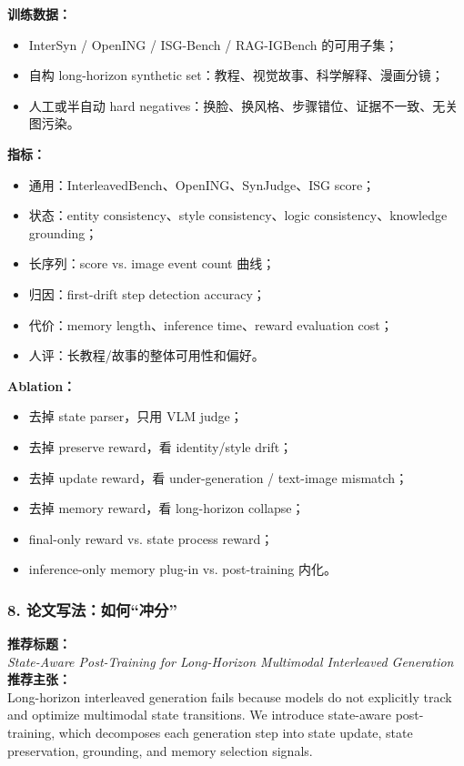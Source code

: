 \textbf{训练数据：}

\begin{itemize}[leftmargin=1.5em]
  \item InterSyn / OpenING / ISG-Bench / RAG-IGBench 的可用子集；
  \item 自构 long-horizon synthetic set：教程、视觉故事、科学解释、漫画分镜；
  \item 人工或半自动 hard negatives：换脸、换风格、步骤错位、证据不一致、无关图污染。
\end{itemize}

\textbf{指标：}

\begin{itemize}[leftmargin=1.5em]
  \item 通用：InterleavedBench、OpenING、SynJudge、ISG score；
  \item 状态：entity consistency、style consistency、logic consistency、knowledge grounding；
  \item 长序列：score vs. image event count 曲线；
  \item 归因：first-drift step detection accuracy；
  \item 代价：memory length、inference time、reward evaluation cost；
  \item 人评：长教程/故事的整体可用性和偏好。
\end{itemize}

\textbf{Ablation：}

\begin{itemize}[leftmargin=1.5em]
  \item 去掉 state parser，只用 VLM judge；
  \item 去掉 preserve reward，看 identity/style drift；
  \item 去掉 update reward，看 under-generation / text-image mismatch；
  \item 去掉 memory reward，看 long-horizon collapse；
  \item final-only reward vs. state process reward；
  \item inference-only memory plug-in vs. post-training 内化。
\end{itemize}

\subsubsection*{8. 论文写法：如何“冲分”}

\begin{summarybox}
\textbf{推荐标题：}\\
\textit{State-Aware Post-Training for Long-Horizon Multimodal Interleaved Generation}\\
\textbf{推荐主张：}\\
Long-horizon interleaved generation fails because models do not explicitly track and optimize multimodal state transitions. We introduce state-aware post-training, which decomposes each generation step into state update, state preservation, grounding, and memory selection signals.
\end{summarybox}

